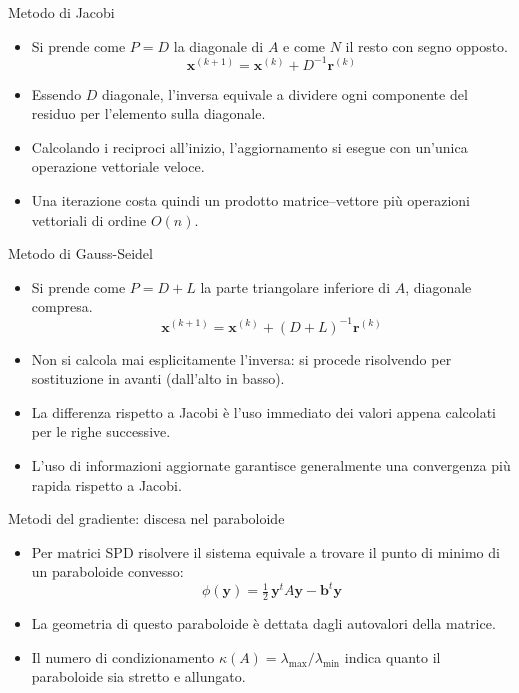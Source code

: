 \documentclass[11pt,aspectratio=169,xcolor=dvipsnames]{beamer}
\begin{document}
\begin{frame}{Metodo di Jacobi}
    \begin{itemize}
        \item Si prende come $P=D$ la diagonale di $A$ e come $N$ il resto con segno opposto.
        \[ \mathbf{x}^{(k+1)} = \mathbf{x}^{(k)} + D^{-1}\mathbf{r}^{(k)} \]
        \item Essendo $D$ diagonale, l'inversa equivale a dividere ogni componente del residuo per l'elemento sulla diagonale.
        \item Calcolando i reciproci all'inizio, l'aggiornamento si esegue con un'unica operazione vettoriale veloce.
        \item Una iterazione costa quindi un prodotto matrice--vettore più operazioni vettoriali di ordine $O(n)$.
    \end{itemize}
\end{frame}

\begin{frame}{Metodo di Gauss-Seidel}
    \begin{itemize}
        \item Si prende come $P=D+L$ la parte triangolare inferiore di $A$, diagonale compresa.
        \[ \mathbf{x}^{(k+1)} = \mathbf{x}^{(k)} + (D+L)^{-1}\mathbf{r}^{(k)} \]
        \item Non si calcola mai esplicitamente l'inversa: si procede risolvendo per sostituzione in avanti (dall'alto in basso).
        \item La differenza rispetto a Jacobi è l'uso immediato dei valori appena calcolati per le righe successive.
        \item L'uso di informazioni aggiornate garantisce generalmente una convergenza più rapida rispetto a Jacobi.
    \end{itemize}
\end{frame}

\begin{frame}{Metodi del gradiente: discesa nel paraboloide}
    \begin{itemize}
        \item Per matrici SPD risolvere il sistema equivale a trovare il punto di minimo di un paraboloide convesso:
        \[ \phi(\mathbf{y})=\tfrac12\,\mathbf{y}^{t}A\mathbf{y}-\mathbf{b}^{t}\mathbf{y} \]
        \item La geometria di questo paraboloide è dettata dagli autovalori della matrice.
        \item Il numero di condizionamento $\kappa(A) = \lambda_{\max}/\lambda_{\min}$ indica quanto il paraboloide sia stretto e allungato.
    \end{itemize}
\end{frame}
\end{document}
